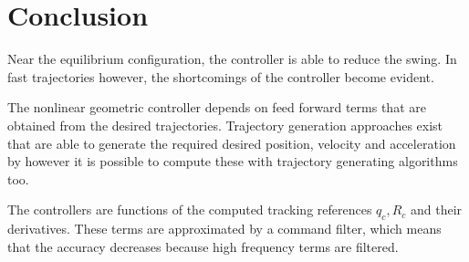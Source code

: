 \newpage
\section{Conclusion}\label{set:exp.con}

Near the equilibrium configuration, the  controller is able to reduce the swing. In fast trajectories however, the shortcomings of the  controller become evident. 

The nonlinear geometric controller depends on feed forward terms that are obtained from the desired trajectories. 
Trajectory generation approaches exist that are able to generate the required desired position, velocity and acceleration by 
however it is possible to compute these with trajectory generating algorithms too.

The controllers are functions of the computed tracking references $ q_c, R_c $ and their derivatives. These terms are approximated by a command filter, which means that the accuracy decreases because high frequency terms are filtered.






